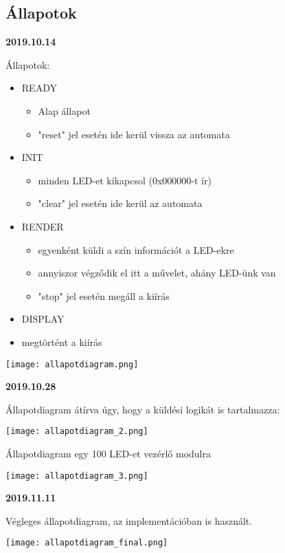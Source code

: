 \documentclass[10pt]{article} %
\begin{document}
\subsection{Állapotok}

\textbf{2019.10.14}

Állapotok:
\begin{itemize}
\item READY
	\begin{itemize}
	\item Alap állapot 
	\item "reset" jel esetén ide kerül vissza az automata
	\end{itemize}
\item INIT
	\begin{itemize}
	\item minden LED-et kikapcsol (0x000000-t ír)
	\item "clear" jel esetén ide kerül az automata
	\end{itemize}
\item RENDER
	\begin{itemize}
	\item egyenként küldi a szín információt a LED-ekre
	\item annyiszor végződik el itt a művelet, ahány LED-ünk van
	\item "stop" jel esetén megáll a kiírás
	\end{itemize}
\item DISPLAY
	\item megtörtént a kiírás
\end{itemize}

\texttt{[image: allapotdiagram.png]}

\textbf{2019.10.28}

Állapotdiagram átírva úgy, hogy a küldési logikát is tartalmazza:

\texttt{[image: allapotdiagram\_2.png]}

Állapotdiagram egy 100 LED-et vezérlő modulra

\texttt{[image: allapotdiagram\_3.png]}

\textbf{2019.11.11}

Végleges állapotdiagram, az implementációban is használt.

\texttt{[image: allapotdiagram\_final.png]}
\end{document}
